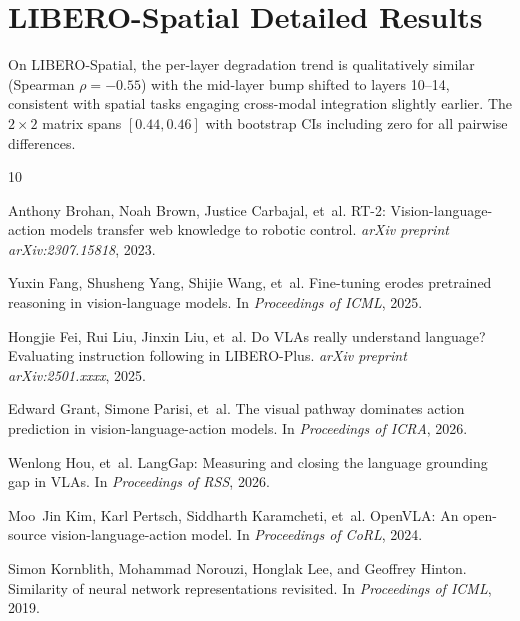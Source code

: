\documentclass[letterpaper]{article}
\begin{document}
\section{LIBERO-Spatial Detailed Results}
\label{app:spatial}

On LIBERO-Spatial, the per-layer degradation trend is qualitatively similar (Spearman $\rho=-0.55$) with the mid-layer bump shifted to layers 10--14, consistent with spatial tasks engaging cross-modal integration slightly earlier.
The $2\times2$ matrix spans $[0.44, 0.46]$ with bootstrap CIs including zero for all pairwise differences.


\begin{thebibliography}{10}

Anthony Brohan, Noah Brown, Justice Carbajal, et~al.
\newblock RT-2: Vision-language-action models transfer web knowledge to robotic control.
\newblock \emph{arXiv preprint arXiv:2307.15818}, 2023.

Yuxin Fang, Shusheng Yang, Shijie Wang, et~al.
\newblock Fine-tuning erodes pretrained reasoning in vision-language models.
\newblock In \emph{Proceedings of ICML}, 2025.

Hongjie Fei, Rui Liu, Jinxin Liu, et~al.
\newblock Do VLAs really understand language? Evaluating instruction following in LIBERO-Plus.
\newblock \emph{arXiv preprint arXiv:2501.xxxx}, 2025.

Edward Grant, Simone Parisi, et~al.
\newblock The visual pathway dominates action prediction in vision-language-action models.
\newblock In \emph{Proceedings of ICRA}, 2026.

Wenlong Hou, et~al.
\newblock LangGap: Measuring and closing the language grounding gap in VLAs.
\newblock In \emph{Proceedings of RSS}, 2026.

Moo~Jin Kim, Karl Pertsch, Siddharth Karamcheti, et~al.
\newblock OpenVLA: An open-source vision-language-action model.
\newblock In \emph{Proceedings of CoRL}, 2024.

Simon Kornblith, Mohammad Norouzi, Honglak Lee, and Geoffrey Hinton.
\newblock Similarity of neural network representations revisited.
\newblock In \emph{Proceedings of ICML}, 2019.


\end{thebibliography}
\end{document}
